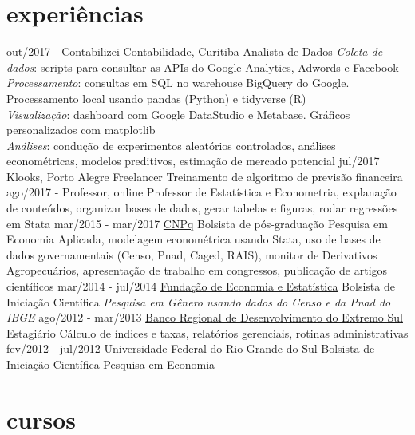 \documentclass[]{friggeri-cv}
\begin{document}
\section{experiências}

\begin{entrylist}
  \entry
    {out/2017 - }
    {\href{https://www.contabilizei.com.br}{Contabilizei Contabilidade}, Curitiba}
    {Analista de Dados}
    {\emph{Coleta de dados}: scripts para consultar as APIs do Google Analytics, Adwords e Facebook \\
     \emph{Processamento}: consultas em SQL no warehouse BigQuery do Google. Processamento local usando pandas (Python) e tidyverse (R) \\
     \emph{Visualização}: dashboard com Google DataStudio e Metabase. Gráficos personalizados com matplotlib \\
     \emph{Análises}: condução de experimentos aleatórios controlados, análises econométricas, modelos preditivos, estimação de mercado potencial}
  \entry
    {jul/2017}
    {Klooks, Porto Alegre}
    {Freelancer}
    {Treinamento de algoritmo de previsão financeira}
  \entry
    {ago/2017 - }
    {Professor, online}
    {}
    {Professor de Estatística e Econometria, explanação de conteúdos, organizar bases de dados, gerar tabelas e figuras, rodar regressões em Stata}
  \entry
    {mar/2015 - mar/2017}
    {\href{cnpq.br}{CNPq}}
    {Bolsista de pós-graduação}
    {Pesquisa em Economia Aplicada, modelagem econométrica usando Stata, uso de bases de dados governamentais (Censo, Pnad, Caged, RAIS), monitor de Derivativos Agropecuários, apresentação de trabalho em congressos, publicação de artigos científicos}
  \entry
    {mar/2014 - jul/2014}
    {\href{https://www.fee.rs.gov.br}{Fundação de Economia e Estatística}}
    {Bolsista de Iniciação Científica}
    {\emph{Pesquisa em Gênero usando dados do Censo e da Pnad do IBGE}}
  \entry
    {ago/2012 - mar/2013}
    {\href{http://www.brde.com.br}{Banco Regional de Desenvolvimento do Extremo Sul}}
    {Estagiário}
    {Cálculo de índices e taxas, relatórios gerenciais, rotinas administrativas}
  \entry
    {fev/2012 - jul/2012}
    {\href{http://www.ufrgs.br}{Universidade Federal do Rio Grande do Sul}}
    {Bolsista de Iniciação Científica}
    {Pesquisa em Economia}
\end{entrylist}

\section{cursos}
\end{document}
